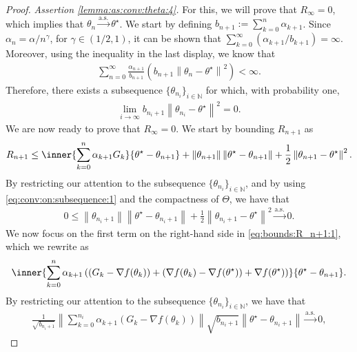 \documentclass[11pt,a4paper]{article}
\theoremstyle{definition}
\begin{document}
\begin{proof}
\emph{Assertion \ref{lemma:as:conv:theta:4}.} For this, we will prove that $R_\infty = 0$, which implies that $\theta_n \overset{\text{a.s.}}{\to} \theta^\star$. We start by defining $b_{n+1} := \sum_{k=0}^n \alpha_{k+1}$. Since $\alpha_n = \alpha/n^\gamma$, for $\gamma \in (1/2,1)$, it can be shown that $\sum_{k=0}^\infty \left(\alpha_{k+1}/b_{k+1}\right) = \infty$. Moreover, using the inequality in the last display, we know that 
\begin{align*}
    \sum_{n=0}^\infty \frac{\alpha_{n+1}}{b_{n+1}} \left(b_{n+1}\left\|\theta_{n}-\theta^\star \right\|^2\right) < \infty.
\end{align*}
Therefore, there exists a subsequence $\{\theta_{n_i}\}_{i \in \mathbb N}$ for which, with probability one,
\begin{align}
\label{eq:conv:on:subsequence:1}
    \lim_{i \to \infty} b_{n_i+1}\left\|\theta_{n_i}-\theta^\star \right\|^2 = 0.
\end{align}
We are now ready to prove that $R_\infty = 0$. We start by bounding $R_{n+1}$ as
\begin{align}
\label{eq:bounds:R_n+1:1}
    R_{n+1} \leq \inner{\sum_{k=0}^n \alpha_{k+1} G_k}{\theta^\star-\theta_{n+1}}
    + \left\|\theta_{n+1}\right\|\left\|\theta^\star-\theta_{n+1}\right\|
    + \frac{1}{2}\left\| \theta_{n+1}-\theta^\star \right\|^2.
\end{align}
By restricting our attention to the subsequence $\{\theta_{n_i}\}_{i \in \mathbb N}$, and by using \eqref{eq:conv:on:subsequence:1} and the compactness of $\Theta$, we have that
\begin{align}
\label{eq:bounds:R_n+1:last:two:terms:1}
    0\leq \left\|\theta_{n_i+1}\right\|\left\|\theta^\star-\theta_{n_i+1}\right\|
    + \frac{1}{2}\left\| \theta_{n_i+1}-\theta^\star  \right\|^2 \overset{\text{a.s.}}{\to} 0.
\end{align}
We now focus on the first term on the right-hand side in \eqref{eq:bounds:R_n+1:1}, which we rewrite as
\begin{align*}
    \inner{\sum_{k=0}^n \alpha_{k+1} \left( (G_k - \nabla {f}(\theta_k)) + (\nabla {f}(\theta_k) - \nabla{f}(\theta^\star))  + \nabla{f}(\theta^\star)\right)}{\theta^\star-\theta_{n+1}}.
\end{align*}
By restricting our attention to the subsequence $\{\theta_{n_i}\}_{i \in \mathbb N}$, we have that
\begin{align*}
    \frac{1}{\sqrt{b_{n_i+1}}} \left\| \sum_{k=0}^{n_i} \alpha_{k+1} (G_k - \nabla {f}(\theta_k))  \right\| \sqrt{b_{n_i+1}} \left\| \theta^\star-\theta_{n_i+1}  \right\| \overset{\text{a.s.}}{\to} 0,

\end{align*}
\end{proof}
\end{document}
